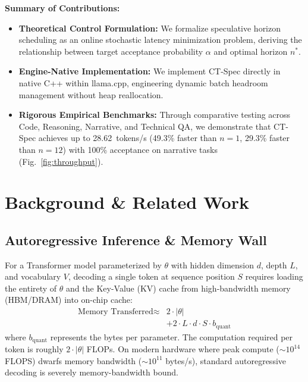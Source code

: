 \documentclass[journal,10pt,twocolumn]{IEEEtran}
\newcommand{\code}[1]{{\ttfamily\small #1}}
\newcommand{\ctspec}{\mbox{CT-Spec}}
\begin{document}
\textbf{Summary of Contributions:}
\begin{itemize}
    \item \textbf{Theoretical Control Formulation:} We formalize speculative horizon scheduling as an online stochastic latency minimization problem, deriving the relationship between target acceptance probability $\alpha$ and optimal horizon $n^*$.
    \item \textbf{Engine-Native Implementation:} We implement \ctspec{} directly in native C++ within \code{llama.cpp}, engineering dynamic batch headroom management without heap reallocation.
    \item \textbf{Rigorous Empirical Benchmarks:} Through comparative testing across Code, Reasoning, Narrative, and Technical QA, we demonstrate that \ctspec{} achieves up to 28.62~tokens/s (49.3\% faster than $n=1$, 29.3\% faster than $n=12$) with 100\% acceptance on narrative tasks (Fig.~\ref{fig:throughput}).
\end{itemize}

\section{Background \& Related Work}

\subsection{Autoregressive Inference \& Memory Wall}
For a Transformer model parameterized by $\theta$ with hidden dimension $d$, depth $L$, and vocabulary $V$, decoding a single token at sequence position $S$ requires loading the entirety of $\theta$ and the Key-Value (KV) cache from high-bandwidth memory (HBM/DRAM) into on-chip cache:
\begin{equation}
\begin{split}
\text{Memory Transferred} \approx{}& 2 \cdot |\theta| \\
&+ 2 \cdot L \cdot d \cdot S \cdot b_{\mathrm{quant}}
\end{split}
\end{equation}
where $b_{\mathrm{quant}}$ represents the bytes per parameter. The computation required per token is roughly $2 \cdot |\theta|$ FLOPs. On modern hardware where peak compute ($\sim 10^{14}$ FLOPS) dwarfs memory bandwidth ($\sim 10^{11}$ bytes/s), standard autoregressive decoding is severely memory-bandwidth bound.
\end{document}
